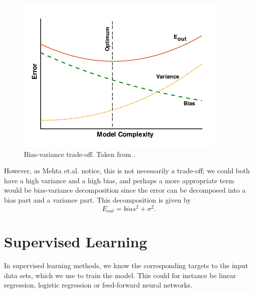 \begin{figure}[H]
	\centering
	\includegraphics[scale=0.6]{Images/bias_variance_tradeoff.png}
	\caption{Bias-variance trade-off. Taken from \cite{mehta_high-bias_2019}.}
	\label{fig:bias_variance_tradeoff}
\end{figure}

However, as Mehta et.al. notice, this is not necessarily a trade-off; we could both have a high variance and a high bias, and perhaps a more appropriate term would be bias-variance decomposition since the error can be decomposed into a bias part and a variance part. \cite{mehta_high-bias_2019} This decomposition is given by
\begin{equation}
E_{out}=bias^2+\sigma^2.
\end{equation}


\section{Supervised Learning}
In supervised learning methods, we know the corresponding targets to the input data sets, which we use to train the model. This could for instance be linear regression, logistic regression or feed-forward neural networks.

